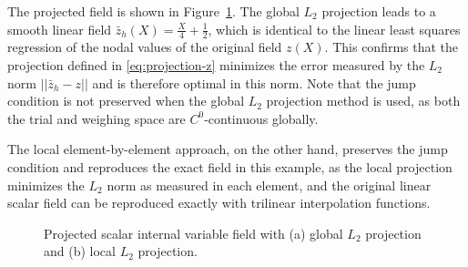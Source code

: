\documentclass[12pt]{article}
\begin{document}
The projected field is shown in Figure~\ref{fig:example-cube}. The global $L_2$
projection leads to a smooth linear field $\bar{z}_{h}(X) = \frac{X}{4} +
\frac{1}{2}$, which is identical to the linear least squares regression of the
nodal values of the original field $z(X)$. This confirms that the projection
defined in \eqref{eq:projection-z} minimizes the error measured by the $L_2$
norm $||\bar{z}_{h} - z||$ and is therefore optimal in this norm. Note that the
jump condition is not preserved when the global $L_2$ projection method is used,
as both the trial and weighing space are $C^{0}$-continuous globally.
 
The local element-by-element approach, on the other hand, preserves the jump
condition and reproduces the exact field in this example, as the local
projection minimizes the $L_2$ norm as measured in each element, and the
original linear scalar field can be reproduced exactly with trilinear
interpolation functions.

\begin{figure}[htbp]
  \begin{center}
    \unitlength=1.0mm
    \caption{Projected scalar internal variable field with (a) global
      $L_2$ projection and (b) local $L_2$ projection.}
    \label{fig:example-cube}
  \end{center}
\end{figure}
\end{document}
